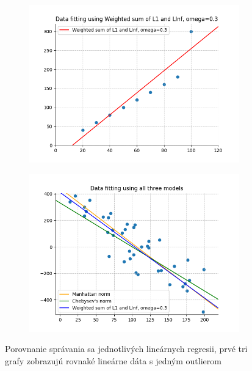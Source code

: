 \documentclass[report.tex]{subfiles}
\begin{document}
\begin{figure}[h!]
\begin{subfigure}[b]{0.48\linewidth}
		\includegraphics[width=\linewidth]{figs/weighted_linear_with_outlier.png}
	\end{subfigure}
	\begin{subfigure}[b]{0.48\linewidth}
		\includegraphics[width=\linewidth]{figs/all_three_random.png}
	\end{subfigure}
	\caption*{\centering Porovnanie správania sa jednotlivých lineárnych regresii, prvé tri grafy zobrazujú rovnaké lineárne dáta s jedným outlierom}
\end{figure}
\end{document}
